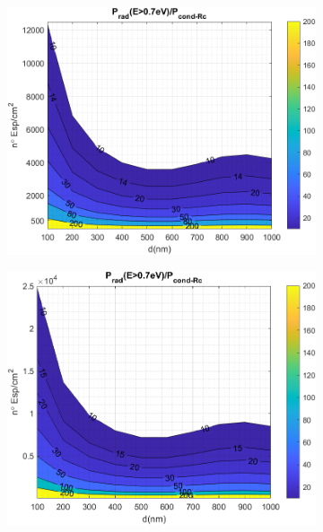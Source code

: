 \begin{figure}[H]
	\centering
	\begin{subfigure}[b]{0.49\textwidth}
		\centering
			\includegraphics[width=1.00\textwidth]{figuras/Resultados/RelacionCondRad/SS_Rc_Intermedio.png}
		\caption{ }
		\label{fig:rel_SsSiO2Ge_Rc_inter}
	\end{subfigure}
	\hfill	
	\begin{subfigure}[b]{0.49\textwidth}
		\centering
			\includegraphics[width=1.00\textwidth]{figuras/Resultados/RelacionCondRad/SS_Rc.png}
		\caption{ }
		\label{fig:rel_SsSiO2Ge_Rc_max}

\end{subfigure}
\end{figure}
